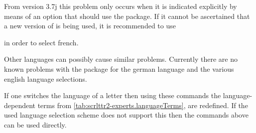 From  version 3.7j this problem only occurs when it is
indicated explicitly by means of an option that  should use the
 package.  If it cannot be ascertained that a new version of
 is being used, it is recommended to use
\begin{lstcode}
  \usepackage[...,frenchb,...]{babel}
\end{lstcode}
in order to select french.

Other languages can possibly cause similar problems. Currently there
are no known problems with the  package for the
german language and the various english language selections.

\begin{Declaration}
\end{Declaration}
If one switches the language of a letter then
using these commands the language-dependent terms from
\autoref{tab:scrlttr2-experts.languageTerms},
 are redefined.  If the used
language selection scheme does not support this then the commands
above can be used directly.
%
\EndIndexGroup


